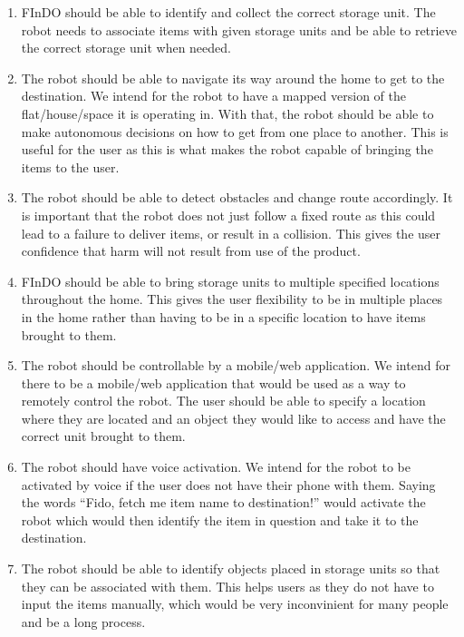 \documentclass{article}
\begin{document}
\begin{enumerate}
\item FInDO should be able to identify and collect the correct storage unit. The robot needs to associate items with given storage units and be able to retrieve the correct storage unit when needed.

\item The robot should be able to navigate its way around the home to get to the destination. We intend for the robot to have a mapped version of the flat/house/space it is operating in. With that, the robot should be able to make autonomous decisions on how to get from one place to another. This is useful for the user as this is what makes the robot capable of bringing the items to the user.

\item The robot should be able to detect obstacles and change route accordingly. It is important that the robot does not just follow a fixed route as this could lead to a failure to deliver items, or result in a collision. This gives the user confidence that harm will not result from use of the product.

\item FInDO should be able to bring storage units to multiple specified locations throughout the home. This gives the user flexibility to be in multiple places in the home rather than having to be in a specific location to have items brought to them. 

\item The robot should be controllable by a mobile/web application. We intend for there to be a mobile/web application that would be used as a way to remotely control the robot. The user should be able to specify a location where they are located and an object they would like to access and have the correct unit brought to them.

\item The robot should have voice activation. We intend for the robot to be activated by voice if the user does not have their phone with them. Saying the words “Fido, fetch me item name to destination!” would activate the robot which would then identify the item in question and take it to the destination.

\item The robot should be able to identify objects placed in storage units so that they can be associated with them. This helps users as they do not have to input the items manually, which would be very inconvinient for many people and be a long process.

\end{enumerate}
\end{document}
